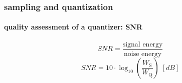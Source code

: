 \begin{frame}
\begin{footnotesize}
\begin{itemize}
                      \hspace{8mm}  \hspace{7mm}
                      \hspace{7mm}  
        \end{itemize}
        \end{footnotesize}
    \end{frame}		
	
	\begin{frame}\frametitle{sampling and quantization}\framesubtitle{quality assessment of a quantizer: SNR}
        \begin{equation}\nonumber
            SNR = \frac{\text{signal energy}}{\text{noise energy}}
        \end{equation}
        \pause
			\begin{equation}\label{eq:snr}
				SNR = 10\cdot\log_{10}\left(\frac{W_{\mathrm{S}}}{W_{\mathrm{Q}}}\right)\; [dB] 
			\end{equation}
	\end{frame}		
	
